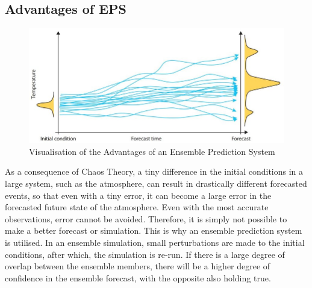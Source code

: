 \subsection{Advantages of EPS}
\begin{figure}[H]
    \centering
    \includegraphics[width=.8\linewidth]{Images/efs.jpg}
    \caption{Visualisation of the Advantages of an Ensemble Prediction System}
    \label{efs}
\end{figure}

As a consequence of Chaos Theory, a tiny difference in the initial conditions in a large system, such as the atmosphere, can result in drastically different forecasted events, so that even with a tiny error, it can become a large error in the forecasted future state of the atmosphere. Even with the most accurate observations, error cannot be avoided. Therefore, it is simply not possible to make a better forecast or simulation. This is why an ensemble prediction system is utilised. In an ensemble simulation, small perturbations are made to the initial conditions, after which, the simulation is re-run. If there is a large degree of overlap between the ensemble members, there will be a higher degree of confidence in the ensemble forecast, with the opposite also holding true\cite{intro_efs}.

